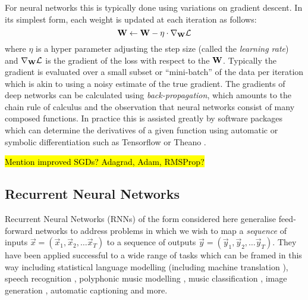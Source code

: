 For neural networks this is typically done using variations on gradient descent. In its simplest
form, each weight is updated at each iteration as follows:
\begin{equation} \label{eq:graddescent}
	\mathbf{W} \gets \mathbf{W} - \eta \cdot \nabla_{\mathbf{W}}\mathcal{L}
\end{equation} where \(\eta\) is a hyper parameter adjusting the step size (called the
\emph{learning rate}) and \(\nabla_{\mathbf{W}}\mathcal{L}\) is the gradient of the loss with respect
to the \(\mathbf{W}\). Typically the gradient is evaluated over a small subset or ``mini-batch''
 of the data per iteration which is akin to using a noisy estimate of the true gradient.
The gradients of deep networks can be calculated using \emph{back-propagation}, which amounts
to the chain rule of calculus and the observation that neural networks consist of many
composed functions. \autocite{Rumelhart1986} In practice this is assisted greatly by software
packages which can determine the derivatives of a given function using automatic or symbolic
differentiation such as Tensorflow \autocite{Abadi2015} or Theano
. \autocite{TheTheanoDevelopmentTeam2016}

\hl{Mention improved SGDs? Adagrad, Adam, RMSProp?}


\subsection{Recurrent Neural Networks}
Recurrent Neural Networks (RNNs) of the form considered here generalise feed-forward networks to
address problems in which we wish to map a \emph{sequence} of inputs 
\(\vec{x} = (\vec{x}_1, \vec{x}_2, \dots \vec{x}_T) \) to a sequence of outputs
\(\vec{y} = (\vec{y}_1, \vec{y}_2, \dots \vec{y}_T) \). They have been applied successful to a
wide range of tasks which can be framed in this way including statistical language modelling
\autocite{Mikolov2012} (including machine translation \autocite{Cho2014, Wu2016a}), speech 
recognition \autocite{Graves2006}, polyphonic music 
modelling \autocite{Boulanger-Lewandowski2012}, music classification \autocite{Choi2016},
image generation \autocite{Gregor2015}, automatic captioning \autocite{Vinyals2016, Xu2015}  and more.

